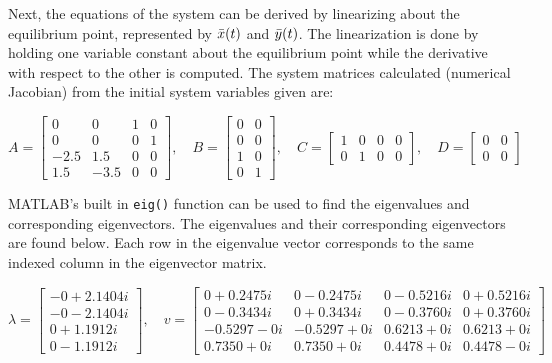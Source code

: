 \documentclass[../notes.tex]{subfiles}
\begin{document}
Next, the equations of the system can be derived by linearizing about the equilibrium point, represented by $\Bar{x}(t)$ and $\Bar{y}(t)$. The linearization is done by holding one variable constant about the equilibrium point while the derivative with respect to the other is computed. The system matrices calculated (numerical Jacobian) from the initial system variables given are:

\begin{equation*} 
  A =
  \begin{bmatrix}
    0 &0 &1 &0\\ 
    0 &0 &0 &1\\
    -2.5 &1.5 &0 &0\\
    1.5 &-3.5 &0 &0
  \end{bmatrix},
\quad
  B =
    \begin{bmatrix}
        0 &0 \\ 
        0 &0 \\
        1 &0 \\
        0 &1
    \end{bmatrix},
\quad
  C =
  \begin{bmatrix}
  1 &0 &0 &0 \\
  0 &1 &0 &0
  \end{bmatrix},
  \quad
  D =
  \begin{bmatrix}
  0 &0\\ 
  0 &0
  \end{bmatrix}
\end{equation*}

MATLAB's built in \verb|eig()| function can be used to find the eigenvalues and corresponding eigenvectors. The eigenvalues and their corresponding eigenvectors are found below. Each row in the eigenvalue vector corresponds to the same indexed column in the eigenvector matrix.

\begin{equation*}
    \lambda = 
    \begin{bmatrix}
        -0 + 2.1404i \\
        -0 - 2.1404i \\ 
         0 + 1.1912i \\
         0 - 1.1912i
    \end{bmatrix},
    \quad
    v = 
    \begin{bmatrix}
        0 + 0.2475i  &0 - 0.2475i   &0 - 0.5216i   &0 + 0.5216i \\
        0 - 0.3434i  &0 + 0.3434i   &0 - 0.3760i   &0 + 0.3760i \\ 
        -0.5297 - 0i  &-0.5297 + 0i   &0.6213 + 0i   &0.6213 + 0i \\ 
         0.7350 + 0i  & 0.7350 + 0i   &0.4478 + 0i   &0.4478 - 0i
    \end{bmatrix}
\end{equation*}
\end{document}
